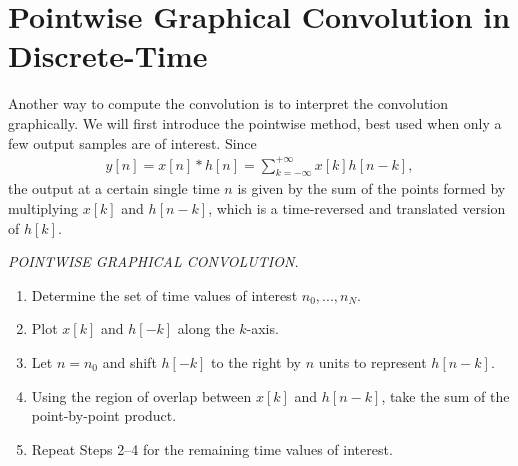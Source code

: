 \documentclass{report}
\begin{document}
\section{Pointwise Graphical Convolution in Discrete-Time}
Another way to compute the convolution is to interpret the convolution graphically. We will first introduce the pointwise method, 
best used when only a few output samples are of interest. Since 
\begin{align*}
    y[n] = x[n] * h[n] = \sum_{k=-\infty}^{+\infty} x[k]h[n-k],
\end{align*}
the output at a certain single time $n$ is given by the sum of the points formed by multiplying $x[k]$ and $h[n-k]$, which is a time-reversed and translated 
version of $h[k]$. 

\begin{tcolorbox}[width=\textwidth,colback={white}, sharp corners]
    \noindent\emph{POINTWISE GRAPHICAL CONVOLUTION.}
    \begin{enumerate}[Step 1:]
        \item Determine the set of time values of interest $n_0, ..., n_N$.
        \item Plot $x[k]$ and $h[-k]$ along the $k$-axis.
        \item Let $n=n_0$ and shift $h[-k]$ to the right by $n$ units to represent $h[n-k]$.
        \item Using the region of overlap between $x[k]$ and $h[n-k]$, take the sum of the point-by-point product.
        \item Repeat Steps 2--4 for the remaining time values of interest.
    \end{enumerate}
\end{tcolorbox}
\end{document}
